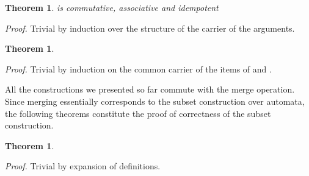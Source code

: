 \documentclass[preprint]{sigplanconf}
\newcounter{item}
\newtheorem{theorem}[item]{Theorem}
\newenvironment{proof}{\begin{trivlist}\item[]{\em Proof.}}{\end{trivlist}}
\begin{document}
\begin{theorem} is commutative, associative and idempotent
\end{theorem}
\begin{proof}
Trivial by induction over the structure of the carrier of the arguments.
\end{proof}

\begin{theorem}

\end{theorem}
\begin{proof}
Trivial by induction on the common carrier of the items of  and .
\end{proof}

All the constructions we presented so far commute with the merge operation.
Since merging essentially corresponds to the subset construction over automata,
the following theorems constitute the proof of correctness of the subset
construction.

\begin{theorem}

\end{theorem}
\begin{proof}
Trivial by expansion of definitions.
\end{proof}
\end{document}
